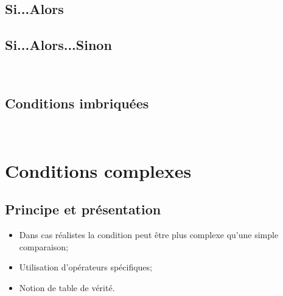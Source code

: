 \documentclass[12pt,a4paper]{article}
\begin{document}
	\subsection{Si...Alors}
	
		\begin{algorithm}[h!]
		\end{algorithm}
	
	
	\subsection{Si...Alors...Sinon}
	
		\begin{algorithm}[h!]
		\end{algorithm}
	\ 
	
	\subsection{Conditions imbriquées}
	
	\ 
		\begin{algorithm}[h!]
		\end{algorithm}

\section{Conditions complexes}

	\subsection{Principe et présentation}
	
		\begin{itemize}
			\item Dans cas réalistes la condition peut être plus complexe qu'une simple comparaison;
			\item Utilisation d'opérateurs spécifiques;
			\item Notion de table de vérité.
		\end{itemize}
		
\end{document}
